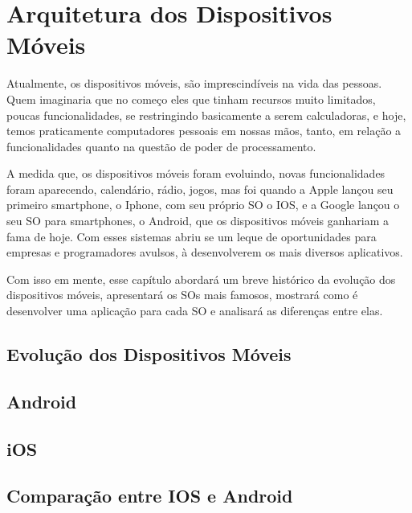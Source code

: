 \chapter{Arquitetura dos Dispositivos Móveis}
\label{c_cap3}

Atualmente, os dispositivos móveis, são imprescindíveis na vida das pessoas. Quem imaginaria que no começo eles que tinham recursos muito limitados, poucas funcionalidades, se restringindo basicamente a serem calculadoras, e hoje, temos praticamente computadores pessoais em nossas mãos, tanto, em relação a funcionalidades quanto na questão de poder de processamento.

A medida que, os dispositivos móveis foram evoluindo, novas funcionalidades foram aparecendo, calendário, rádio, jogos, mas foi quando a Apple lançou seu primeiro smartphone, o Iphone, com seu próprio \ac{SO} o IOS, e a Google lançou o seu \ac{SO} para smartphones, o Android, que os dispositivos móveis ganhariam a fama de hoje. Com esses sistemas abriu se um leque de oportunidades para empresas e programadores avulsos, à desenvolverem os mais diversos aplicativos.

Com isso em mente, esse capítulo abordará um breve histórico da evolução dos dispositivos móveis, apresentará os \ac{SO}s mais famosos, mostrará como é desenvolver uma aplicação para cada \ac{SO} e analisará as diferenças entre elas.

\section{Evolução dos Dispositivos Móveis}


\section{Android}
\section{iOS}
\section{Comparação entre IOS e Android}




